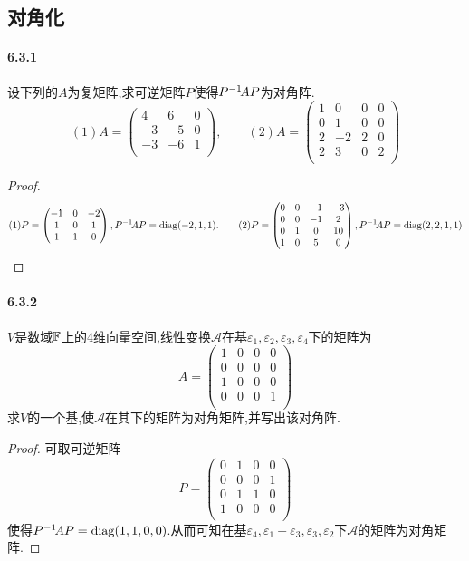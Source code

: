 \documentclass[11pt]{article}
\begin{document}
\subsection{对角化}
\paragraph{6.3.1}设下列的$A$为复矩阵,求可逆矩阵$P$使得$P^{-1}\! A P$为对角阵.
$$(1)A=\begin{pmatrix}
    4 & 6 & 0 \\
    -3 & -5 & 0 \\
    -3 & -6 & 1 \\
\end{pmatrix}, \qquad (2)A=\begin{pmatrix}
    1 & 0 & 0 & 0 \\
    0 & 1 & 0 & 0 \\
    2 & -2 & 2 & 0 \\
    2 & 3 & 0 & 2 \\
\end{pmatrix}$$
\begin{proof}
    $$(1)P=\begin{pmatrix}
        -1 & 0 & -2 \\
        1 & 0 & 1 \\
        1 & 1 & 0 \\
    \end{pmatrix}, P^{-1}\! AP=\operatorname{diag}(-2,1,1).\qquad (2)P=\begin{pmatrix}
        0 & 0 & -1 & -3 \\
        0 & 0 & -1 & 2 \\
        0 & 1 & 0 & 10 \\
        1 & 0 & 5 & 0 \\
    \end{pmatrix}, P^{-1}\! AP=\operatorname{diag}(2,2,1,1)$$
\end{proof}
\paragraph{6.3.2}$V$是数域$\mathbb{F}$上的4维向量空间,线性变换$\mathscr{A}$在基$\varepsilon_1,\varepsilon_2,\varepsilon_3,\varepsilon_4$下的矩阵为
$$A=\begin{pmatrix}
    1 & 0 & 0 & 0 \\
    0 & 0 & 0 & 0 \\
    1 & 0 & 0 & 0 \\
    0 & 0 & 0 & 1 \\
\end{pmatrix}$$
求$V$的一个基,使$\mathscr{A}$在其下的矩阵为对角矩阵,并写出该对角阵.
\begin{proof}
    可取可逆矩阵
    $$P=\begin{pmatrix}
        0 & 1 & 0 & 0 \\
        0 & 0 & 0 & 1 \\
        0 & 1 & 1 & 0 \\
        1 & 0 & 0 & 0 \\
    \end{pmatrix}$$
    使得$P^{-1}\! A P=\operatorname{diag}(1,1,0,0)$.从而可知在基$\varepsilon_4, \varepsilon_1+\varepsilon_3,\varepsilon_3,\varepsilon_2$下$\mathscr{A}$的矩阵为对角矩阵.
\end{proof}
\end{document}
